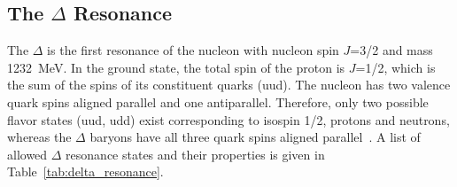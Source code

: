 \subsection{The $\Delta$ Resonance}
\label{The Delta Resonance}

The $\Delta$ is the first resonance of the nucleon with nucleon spin $J$=3/2 and mass 1232~MeV. In the ground state, the total spin of the proton is $J$=1/2, which is the sum of the spins of its constituent quarks (uud). The nucleon has two valence quark spins aligned parallel and one antiparallel. Therefore, only two possible flavor states (uud, udd) exist corresponding to isospin 1/2, protons and neutrons, whereas the $\Delta$ baryons have all three quark spins aligned parallel~\cite{Klempt:2002cu}. A list of allowed $\Delta$ resonance states and their properties is given in Table~\ref{tab:delta_resonance}.


